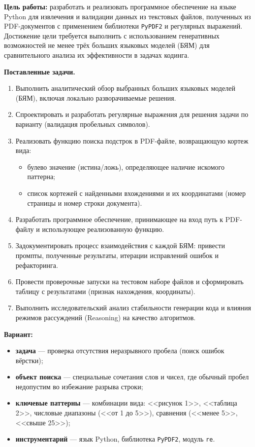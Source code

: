 
\textbf{Цель работы:}
разработать и реализовать программное обеспечение на языке Python для извлечения и валидации данных из текстовых файлов, полученных из PDF-документов с применением библиотеки \texttt{PyPDF2} и регулярных выражений. Достижение цели требуется выполнить с использованием генеративных возможностей не менее трёх больших языковых моделей (БЯМ) для сравнительного анализа их эффективности в задачах кодинга.

\textbf{Поставленные задачи.}
\begin{enumerate}
    \item Выполнить аналитический обзор выбранных больших языковых моделей (БЯМ), включая локально разворачиваемые решения.
    \item Спроектировать и разработать регулярные выражения для решения задачи по варианту (валидация пробельных символов).
    \item Реализовать функцию поиска подстрок в PDF-файле, возвращающую кортеж вида:
    \begin{itemize}
        \item булево значение (истина/ложь), определяющее наличие искомого паттерна;
        \item список кортежей с найденными вхождениями и их координатами (номер страницы и номер строки документа).
    \end{itemize}
    \item Разработать программное обеспечение, принимающее на вход путь к PDF-файлу и использующее реализованную функцию.
    \item Задокументировать процесс взаимодействия с каждой БЯМ: привести промпты, полученные результаты, итерации исправлений ошибок и рефакторинга.
    \item Провести проверочные запуски на тестовом наборе файлов и сформировать таблицу с результатами (признак нахождения, координаты).
    \item Выполнить исследовательский анализ стабильности генерации кода и влияния режимов рассуждений (Reasoning) на качество алгоритмов.
\end{enumerate}

\textbf{Вариант:}
\begin{itemize}
    \item \textbf{задача} --- проверка отсутствия неразрывного пробела (поиск ошибок вёрстки);
    \item \textbf{объект поиска} --- специальные сочетания слов и чисел, где обычный пробел недопустим во избежание разрыва строки;
    \item \textbf{ключевые паттерны} --- комбинации вида: <<рисунок 1>>, <<таблица 2>>, числовые диапазоны (<<от 1 до 5>>), сравнения (<<менее 5>>, <<свыше 25>>);
    \item \textbf{инструментарий} --- язык Python, библиотека \texttt{PyPDF2}, модуль \texttt{re}.
\end{itemize}

\clearpage